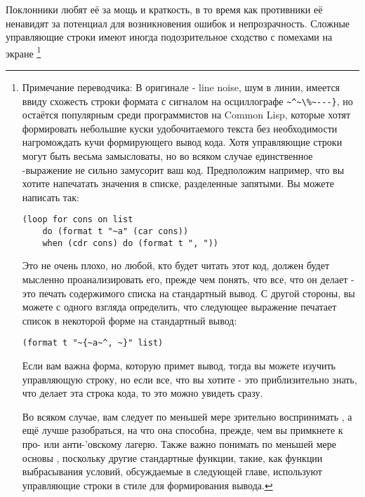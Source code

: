 Поклонники  любят её за мощь и краткость, в то время как противники её
ненавидят за потенциал для возникновения ошибок и непрозрачность. Сложные управляющие
строки  имеют иногда подозрительное сходство с помехами на экране
\footnote{Примечание переводчика: В оригинале - line noise, шум в линии, имеется ввиду
  схожесть строки формата с сигналом на осциллографе \lstinline!~^~\%~---}!, но
 остаётся популярным среди программистов на Common Lisp, которые хотят
формировать небольшие куски удобочитаемого текста без необходимости нагромождать кучи
формирующего вывод кода. Хотя управляющие строки  могут быть весьма
замысловаты, но во всяком случае единственное -выражение не сильно замусорит
ваш код. Предположим например, что вы хотите напечатать значения в списке, разделенные
запятыми. Вы можете написать так:

\begin{lstlisting}
(loop for cons on list
    do (format t "~a" (car cons))
    when (cdr cons) do (format t ", "))
\end{lstlisting}

Это не очень плохо, но любой, кто будет читать этот код, должен будет мысленно
проанализировать его, прежде чем понять, что все, что он делает - это печать содержимого
списка  на стандартный вывод. С другой стороны, вы можете с одного взгляда
определить, что следующее выражение печатает список в некоторой форме на стандартный
вывод:

\begin{lstlisting}
(format t "~{~a~^, ~}" list)
\end{lstlisting}

Если вам важна форма, которую примет вывод, тогда вы можете изучить управляющую строку, но
если все, что вы хотите - это приблизительно знать, что делает эта строка кода, то это
можно увидеть сразу.

Во всяком случае, вам следует по меньшей мере зрительно воспринимать , а ещё
лучше разобраться, на что она способна, прежде, чем вы примкнете к про- или
анти-'овскому лагерю. Также важно понимать по меньшей мере основы
, поскольку другие стандартные функции, такие, как функции выбрасывания
условий, обсуждаемые в следующей главе, используют управляющие строки в стиле
 для формирования вывода.

}
